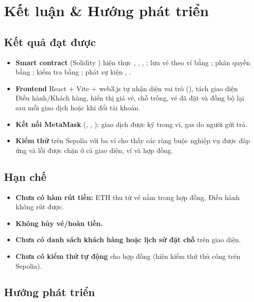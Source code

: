 \section{Kết luận \& Hướng phát triển}
\label{sec:ch8}

\subsection{Kết quả đạt được}

\begin{itemize}[leftmargin=1.5em]
    \item \textbf{Smart contract}  (Solidity ) hiện thực , , ,
          ; lưu vé theo ví bằng ; phân quyền bằng ; kiểm tra bằng ; phát sự kiện , .
    \item \textbf{Frontend} React + Vite + web3.js tự nhận diện vai trò (), tách giao diện Điều hành/Khách hàng, hiển thị giá vé, chỗ trống, vé đã đặt
          và đồng bộ lại sau mỗi giao dịch hoặc khi đổi tài khoản.
    \item \textbf{Kết nối MetaMask} (, , ); giao dịch được ký trong ví, gas do người gửi trả.
    \item \textbf{Kiểm thử} trên Sepolia với ba ví cho thấy các ràng buộc nghiệp vụ được đáp ứng và lỗi được chặn ở cả giao diện, ví và hợp đồng.
\end{itemize}

\subsection{Hạn chế}

\begin{itemize}[leftmargin=1.5em]
    \item \textbf{Chưa có hàm rút tiền:} ETH thu từ vé nằm trong hợp đồng, Điều hành không rút được.
    \item \textbf{Không hủy vé/hoàn tiền.}
    \item \textbf{Chưa có danh sách khách hàng hoặc lịch sử đặt chỗ} trên giao diện.
    \item \textbf{Chưa có kiểm thử tự động} cho hợp đồng (hiện kiểm thử thủ công trên Sepolia).
\end{itemize}

\subsection{Hướng phát triển}


